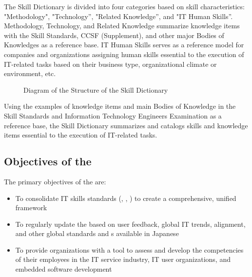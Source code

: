 The Skill Dictionary is divided into four categories based on skill characteristics: "Methodology",
"Technology”, "Related Knowledge”, and "IT Human Skills”.
Methodology, Technology, and Related Knowledge summarize knowledge items with the Skill Standards,
CCSF (Supplement), and other major Bodies of Knowledges as a reference base.
IT Human Skills serves as a reference model for companies and organizations assigning human skills
essential to the execution of IT-related tasks based on their business type, organizational climate or
environment, etc.

\begin{figure}[H]
    \centering
    \caption{  Diagram of the Structure of the Skill Dictionary }
    \label{fig:skill_Dictionary_Diagram}
\end{figure}

\newpage
Using the examples of knowledge items and main Bodies of Knowledge in the Skill Standards and
Information Technology Engineers Examination as a reference base, the Skill Dictionary summarizes and
catalogs skills and knowledge items essential to the execution of IT-related tasks.

\subsection{Objectives of the }
The primary objectives of the  are:

\begin{itemize}
    \item To consolidate IT skills standards (, , ) to create a comprehensive, unified framework
    \item To regularly update the  based on user feedback, global IT trends,  alignment, and other global standards and s available in Japanese
    \item To provide organizations with a tool to assess and develop the competencies of their employees in the IT service industry, IT user organizations, and embedded software development
\end{itemize}


